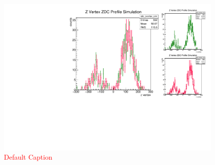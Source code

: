 \begin{figure}
\begin{center}
\includegraphics[width=\linewidth,height=\textheight,keepaspectratio]{../HourglassCorrection/figs/vsigma}
\caption{ \textcolor{red}{Default Caption} }
\label{fig:vsigma}
\end{center}
\end{figure}